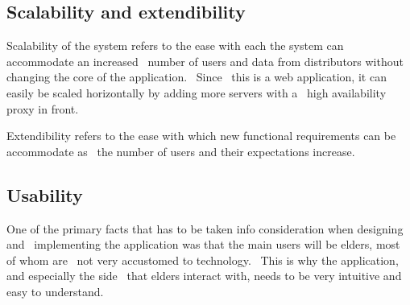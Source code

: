 \subsection{Scalability and extendibility}
\label{subsec:specification-scalability}
Scalability of the system refers to the ease with each the system can accommodate an increased \
number of users and data from distributors without changing the core of the application. \
Since \
this is a web application, it can easily be scaled horizontally by adding more servers with a \
high availability proxy in front.

Extendibility refers to the ease with which new functional requirements can be accommodate as \
the number of users and their expectations increase.

\subsection{Usability}
\label{subsec:specification-usability}
One of the primary facts that has to be taken info consideration when designing and \
implementing the application was that the main users will be elders, most of whom are \
not very accustomed to technology. \
This is why the application, and especially the side \
that elders interact with, needs to be very intuitive and easy to understand.
